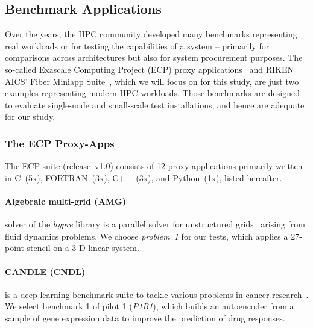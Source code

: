 \subsection{Benchmark Applications}\label{ssec:bm}




Over the years, the HPC community developed many benchmarks representing real workloads or for testing the
capabilities of a system -- primarily for comparisons across architectures but also for system
procurement purposes.
The so-called Exascale Computing Project (ECP) proxy applications~\cite{noauthor_ecp_2018} and
RIKEN AICS' Fiber Miniapp Suite~\cite{riken_aics_fiber_2015}, which we will focus on for this study, are just
two examples representing modern HPC workloads.
Those benchmarks are designed to evaluate single-node and small-scale test installations,
and hence are adequate for our study.


\subsubsection{The ECP Proxy-Apps}\label{ssec:ecp}
The ECP suite (release~v1.0) consists of 12 proxy applications primarily written in C~(5x),
FORTRAN~(3x), C++~(3x), and Python~(1x), listed hereafter.

\paragraph{Algebraic multi-grid (AMG)} solver of the \textit{hypre} library is a parallel solver
for unstructured grids~\cite{park_high-performance_2015} arising from fluid dynamics problems.
We choose \textit{problem~1} for our tests, which applies a 27-point stencil on a 3-D linear system.

\paragraph{CANDLE (CNDL)} is a deep learning benchmark suite to tackle various problems in cancer
research~\cite{wozniak_candle/supervisor:_2018}.
We select benchmark 1 of pilot 1 (\textit{P1B1}), which builds an autoencoder from a sample of gene
expression data to improve the prediction of drug responses.


